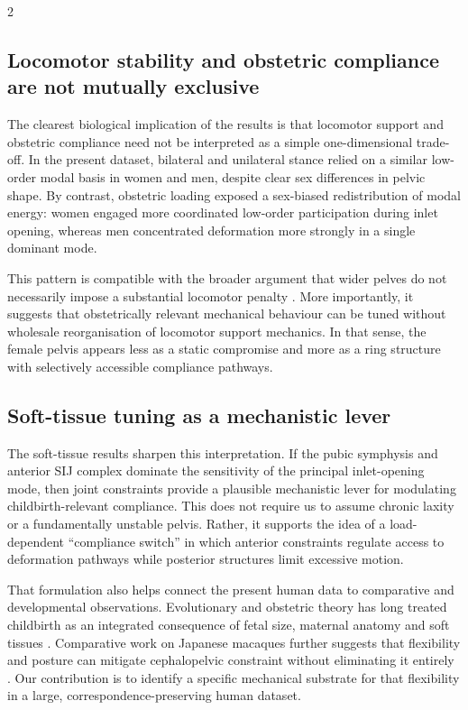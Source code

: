 \documentclass[openacc]{rsproca_new}
\begin{document}
\begin{multicols}{2}
\subsection{Locomotor stability and obstetric compliance are not mutually exclusive}

The clearest biological implication of the results is that locomotor support and obstetric compliance need not be interpreted as a simple one-dimensional trade-off. In the present dataset, bilateral and unilateral stance relied on a similar low-order modal basis in women and men, despite clear sex differences in pelvic shape. By contrast, obstetric loading exposed a sex-biased redistribution of modal energy: women engaged more coordinated low-order participation during inlet opening, whereas men concentrated deformation more strongly in a single dominant mode.

This pattern is compatible with the broader argument that wider pelves do not necessarily impose a substantial locomotor penalty \cite{Warrener2015}. More importantly, it suggests that obstetrically relevant mechanical behaviour can be tuned without wholesale reorganisation of locomotor support mechanics. In that sense, the female pelvis appears less as a static compromise and more as a ring structure with selectively accessible compliance pathways.

\subsection{Soft-tissue tuning as a mechanistic lever}

The soft-tissue results sharpen this interpretation. If the pubic symphysis and anterior SIJ complex dominate the sensitivity of the principal inlet-opening mode, then joint constraints provide a plausible mechanistic lever for modulating childbirth-relevant compliance. This does not require us to assume chronic laxity or a fundamentally unstable pelvis. Rather, it supports the idea of a load-dependent ``compliance switch'' in which anterior constraints regulate access to deformation pathways while posterior structures limit excessive motion.

That formulation also helps connect the present human data to comparative and developmental observations. Evolutionary and obstetric theory has long treated childbirth as an integrated consequence of fetal size, maternal anatomy and soft tissues \cite{RosenbergTrevathan2002,Pavlicev2020}. Comparative work on Japanese macaques further suggests that flexibility and posture can mitigate cephalopelvic constraint without eliminating it entirely \cite{Pink2024}. Our contribution is to identify a specific mechanical substrate for that flexibility in a large, correspondence-preserving human dataset.


\end{multicols}
\end{document}
